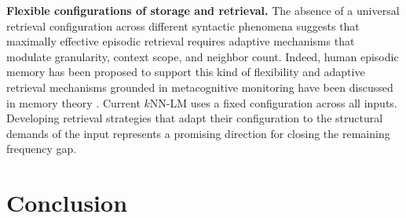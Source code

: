 


\noindent \textbf{Flexible configurations of storage and retrieval.} 
The absence of a universal retrieval configuration across different syntactic phenomena suggests that maximally effective episodic retrieval requires adaptive mechanisms that modulate granularity, context scope, and neighbor count.
Indeed, human episodic memory has been proposed to support this kind of flexibility \citep{duff2012hippocampus} and adaptive retrieval mechanisms grounded in metacognitive monitoring have been discussed in memory theory \citep{nelson1990metamemory}. Current $k$NN-LM uses a fixed configuration across all inputs. Developing retrieval strategies that adapt their configuration to the structural demands of the input represents a promising direction for closing the remaining frequency gap.



\section{Conclusion}

